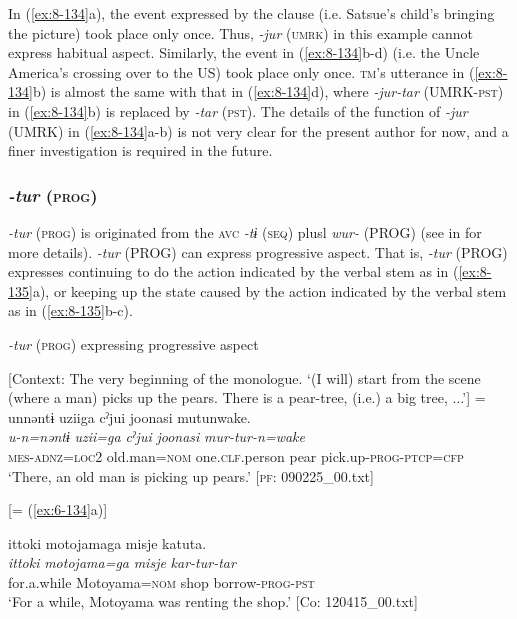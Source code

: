 In (\ref{ex:8-134}a), the event expressed by the clause (i.e. Satsue’s child’s bringing the picture) took place only once. Thus, \textit{-jur} (\textsc{umrk}) in this example cannot express habitual aspect. Similarly, the event in (\ref{ex:8-134}b-d) (i.e. the Uncle America’s crossing over to the US) took place only once. \textsc{tm}’s utterance in (\ref{ex:8-134}b) is almost the same with that in (\ref{ex:8-134}d), where \textit{-jur-tar} (UMRK-\textsc{pst}) in (\ref{ex:8-134}b) is replaced by \textit{-tar} (\textsc{pst}). The details of the function of \textit{-jur} (UMRK) in (\ref{ex:8-134}a-b) is not very clear for the present author for now, and a finer investigation is required in the future.

\subsubsection{\textit{-tur} (\textsc{prog})}

\textit{-tur} (\textsc{prog}) is originated from the \textsc{avc} \textit{-tɨ} (\textsc{seq}) plusl \textit{wur-} (PROG) (see  in  for more details). \textit{-tur} (PROG) can express progressive aspect. That is, \textit{-tur} (PROG) expresses continuing to do the action indicated by the verbal stem as in (\ref{ex:8-135}a), or keeping up the state caused by the action indicated by the verbal stem as in (\ref{ex:8-135}b-c).

\ea\label{ex:8-135}
  \textit{-tur} (\textsc{prog}) expressing progressive aspect

  [Context: The very beginning of the monologue. {\TM}
‘(I will) start from the scene (where a man) picks up the pears. There is a pear-tree, (i.e.) a big tree, ...’] = \\

\ea
{\TM}
\glll  unnəntɨ  uziiga  cˀjui  joonasi      mutunwake.\\
\textit{u-n=nəntɨ}  \textit{uzii=ga}  \textit{cˀjui}  \textit{joonasi}      \textit{mur-tur-n=wake}\\
\textsc{mes}-\textsc{adnz}=\textsc{loc}2  old.man=\textsc{nom}  one.\textsc{clf}.person  pear  pick.up-\textsc{prog}-\textsc{ptcp}=\textsc{cfp}\\
\glt ‘There, an old man is picking up pears.’ [\textsc{pf}: 090225\_00.txt]

\ex {}[= (\ref{ex:6-134}a)]

{\TM}
\glll  {\textbar}ittoki{\textbar}  motojamaga  misje  katuta.\\
\textit{ittoki}  \textit{motojama=ga}  \textit{misje}  \textit{kar-tur-tar}\\
for.a.while  Motoyama=\textsc{nom}  shop  borrow-\textsc{prog}-\textsc{pst}\\
\glt ‘For a while, Motoyama was renting the shop.’ [Co: 120415\_00.txt]

